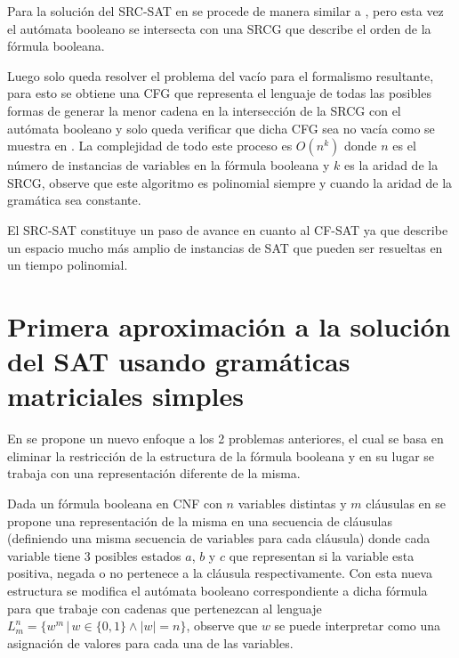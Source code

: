 \documentclass[12pt]{article}
\begin{document}
Para la solución del SRC-SAT en \cite{aSRCSAT} se procede de manera similar a \cite{aCFSAT}, pero esta vez el autómata
booleano se intersecta con una SRCG que describe el orden de la fórmula booleana.

Luego solo queda resolver el problema del vacío para el formalismo resultante, para esto se obtiene una CFG que representa 
el lenguaje de todas las posibles formas de generar la menor cadena en la intersección de la SRCG con el autómata booleano 
y solo queda verificar que dicha CFG sea no vacía como se muestra en \cite{aCFSAT}. La complejidad de todo este proceso es 
$O(n^k)$ donde $n$ es el número de instancias de variables en la fórmula booleana y $k$ es la aridad de la SRCG, observe 
que este algoritmo es polinomial siempre y cuando la aridad de la gramática sea constante.

El SRC-SAT constituye un paso de avance en cuanto al CF-SAT ya que describe un espacio mucho más amplio de instancias de SAT
que pueden ser resueltas en un tiempo polinomial.


\section{Primera aproximación a la solución del SAT usando gramáticas matriciales simples}

En \cite{aSMSAT} se propone un nuevo enfoque a los 2 problemas anteriores, el cual se basa en eliminar la restricción de la estructura de la fórmula booleana y en su lugar se trabaja con una representación diferente de la misma.

Dada un fórmula booleana en CNF con $n$ variables distintas y $m$ cláusulas en \cite{aSMSAT} se propone una representación de la misma en una secuencia de cláusulas (definiendo una misma secuencia de variables para cada cláusula) donde cada variable tiene 3 posibles estados $a$, $b$ y $c$ que representan si la variable esta positiva, negada o no pertenece a la cláusula respectivamente. Con esta nueva estructura se modifica el autómata booleano correspondiente a dicha fórmula para que trabaje con cadenas que pertenezcan al lenguaje $L^n_m=\{w^m\,|\,w\in\{0,1\} \wedge |w|=n\}$, observe que $w$ se puede interpretar como una asignación de valores para cada una de las variables.

\end{document}
